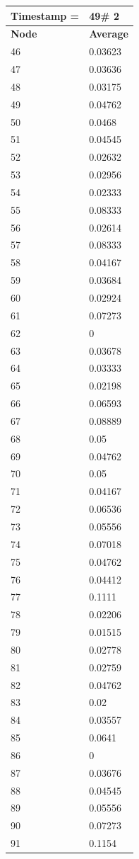 \begin{tabular}{|l||l|}
\hline
\textbf{Timestamp =} & \textbf{49}\# 2\\\hline
	\textbf{Node} & \textbf{Average} \\ \hline
\hline
	46 & 0.03623 \\ \hline
	47 & 0.03636 \\ \hline
	48 & 0.03175 \\ \hline
	49 & 0.04762 \\ \hline
	50 & 0.0468 \\ \hline
	51 & 0.04545 \\ \hline
	52 & 0.02632 \\ \hline
	53 & 0.02956 \\ \hline
	54 & 0.02333 \\ \hline
	55 & 0.08333 \\ \hline
	56 & 0.02614 \\ \hline
	57 & 0.08333 \\ \hline
	58 & 0.04167 \\ \hline
	59 & 0.03684 \\ \hline
	60 & 0.02924 \\ \hline
	61 & 0.07273 \\ \hline
	62 & 0 \\ \hline
	63 & 0.03678 \\ \hline
	64 & 0.03333 \\ \hline
	65 & 0.02198 \\ \hline
	66 & 0.06593 \\ \hline
	67 & 0.08889 \\ \hline
	68 & 0.05 \\ \hline
	69 & 0.04762 \\ \hline
	70 & 0.05 \\ \hline
	71 & 0.04167 \\ \hline
	72 & 0.06536 \\ \hline
	73 & 0.05556 \\ \hline
	74 & 0.07018 \\ \hline
	75 & 0.04762 \\ \hline
	76 & 0.04412 \\ \hline
	77 & 0.1111 \\ \hline
	78 & 0.02206 \\ \hline
	79 & 0.01515 \\ \hline
	80 & 0.02778 \\ \hline
	81 & 0.02759 \\ \hline
	82 & 0.04762 \\ \hline
	83 & 0.02 \\ \hline
	84 & 0.03557 \\ \hline
	85 & 0.0641 \\ \hline
	86 & 0 \\ \hline
	87 & 0.03676 \\ \hline
	88 & 0.04545 \\ \hline
	89 & 0.05556 \\ \hline
	90 & 0.07273 \\ \hline
	91 & 0.1154 \\ \hline
\end{tabular}
